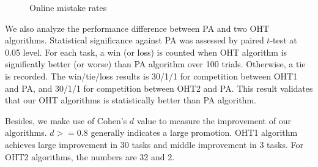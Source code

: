 \documentclass[twocolumn]{article}
\begin{document}
\begin{figure}[!htb]
\begin{center}
{  }
  \caption{Online mistake rates}
  \label{Online mistake rates}
\end{center}
\end{figure}

We also analyze the performance difference between PA and two OHT algorithms.
Statistical significance against PA was assessed by paired $t$-test at 0.05 level.
For each task, a win (or loss) is counted when OHT algorithm is significatly better (or worse) than PA algorithm over 100 trials.
Otherwise, a tie is recorded.
The win/tie/loss results is 30/1/1 for competition between OHT1 and PA, and 30/1/1 for competition between  OHT2 and PA.
This result validates that our OHT algorithms is statistically better than PA algorithm.

Besides, we make use of Cohen's $d$ value to measure the improvement of our algorithms.
$d >= 0.8$ generally indicates a large promotion.
OHT1 algorithm achieves large improvement in 30 tasks and middle improvement in 3 tasks.
For OHT2 algorithms, the numbers are 32 and 2.
\end{document}
